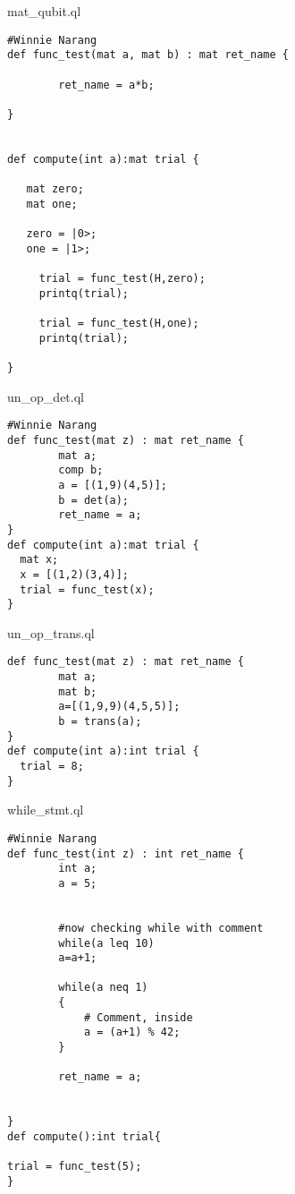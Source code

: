 mat\_qubit.ql
\begin{lstlisting}
#Winnie Narang
def func_test(mat a, mat b) : mat ret_name { 
        
        ret_name = a*b;

}


def compute(int a):mat trial {
  
   mat zero;
   mat one;

   zero = |0>;
   one = |1>;

     trial = func_test(H,zero);
     printq(trial);

     trial = func_test(H,one);
     printq(trial);

}
\end{lstlisting}

un\_op\_det.ql
\begin{lstlisting}
#Winnie Narang
def func_test(mat z) : mat ret_name { 
        mat a;
        comp b;
        a = [(1,9)(4,5)];
        b = det(a);
        ret_name = a;
}
def compute(int a):mat trial {
  mat x;
  x = [(1,2)(3,4)];
  trial = func_test(x);
}
\end{lstlisting}
un\_op\_trans.ql
\begin{lstlisting}
def func_test(mat z) : mat ret_name { 
        mat a;
        mat b;
        a=[(1,9,9)(4,5,5)];
        b = trans(a);
}
def compute(int a):int trial {
  trial = 8;
}
\end{lstlisting}
while\_stmt.ql
\begin{lstlisting}
#Winnie Narang
def func_test(int z) : int ret_name { 
        int a; 
        a = 5; 
        

        #now checking while with comment
        while(a leq 10)
        a=a+1;
        
        while(a neq 1)
        {
            # Comment, inside
            a = (a+1) % 42;
        }

        ret_name = a;


}
def compute():int trial{

trial = func_test(5);
}
\end{lstlisting}
